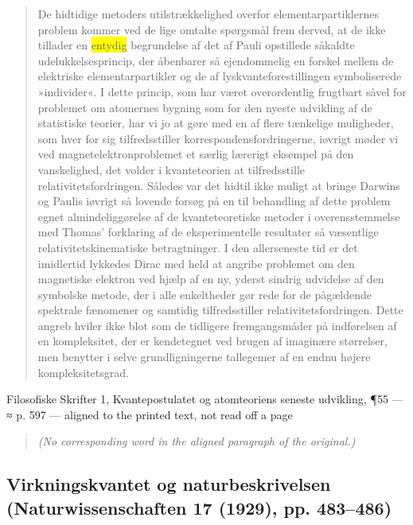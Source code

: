 \documentclass[11pt]{article}
\newcommand{\dcite}[1]{{\nopagebreak\raggedleft\small #1\par}\medskip}
\newcommand{\tlg}[1]{{\setlength{\fboxsep}{0.8pt}\colorbox{yellow}{#1}}}
\begin{document}
\begin{quote}
De hidtidige metoders utilstrækkelighed overfor elementarpartiklernes problem kommer ved de lige omtalte spørgsmål frem derved, at de ikke tillader en \tlg{entydig} begrundelse af det af Pauli opstillede såkaldte udelukkelsesprincip, der åbenbarer så ejendommelig en forskel mellem de elektriske elementarpartikler og de af lyskvanteforestillingen symboliserede »individer«. I dette princip, som har været overordentlig frugtbart såvel for problemet om atomernes bygning som for den nyeste udvikling af de statistiske teorier, har vi jo at gøre med en af flere tænkelige muligheder, som hver for sig tilfredsstiller korrespondensfordringerne, iøvrigt møder vi ved magnetelektronproblemet et særlig lærerigt eksempel på den vanskelighed, det volder i kvanteteorien at tilfredsstille relativitetsfordringen. Således var det hidtil ikke muligt at bringe Darwins og Paulis iøvrigt så lovende forsøg på en til behandling af dette problem egnet almindeliggørelse af de kvanteteoretiske metoder i overensstemmelse med Thomas’ forklaring af de eksperimentelle resultater så væsentlige relativitetskinematiske betragtninger. I den allerseneste tid er det imidlertid lykkedes Dirac med held at angribe problemet om den magnetiske elektron ved hjælp af en ny, yderst sindrig udvidelse af den symbolske metode, der i alle enkeltheder gør rede for de pågældende spektrale fænomener og samtidig tilfredsstiller relativitetsfordringen. Dette angreb hviler ikke blot som de tidligere fremgangsmåder på indførelsen af en kompleksitet, der er kendetegnet ved brugen af imaginære størrelser, men benytter i selve grundligningerne tallegemer af en endnu højere kompleksitetsgrad.
\end{quote}
\dcite{Filosofiske Skrifter 1, Kvantepostulatet og atomteoriens seneste udvikling, ¶55 — ≈ p. 597 — aligned to the printed text, not read off a page}
{\footnotesize\begin{quote}\itshape (No corresponding word in the aligned paragraph of the original.)\end{quote}}

\subsection{Virkningskvantet og naturbeskrivelsen \normalfont(Naturwissenschaften 17 (1929), pp. 483–486)}
\end{document}
